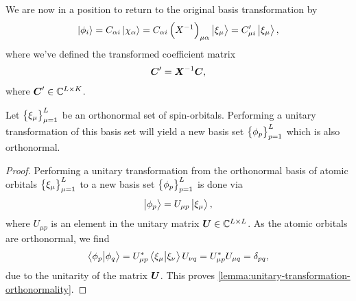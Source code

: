             We are now in a position to return to the original basis
            transformation by
            \begin{align}
                \ket{\phi_i}
                = C_{\alpha i}\ket{\chi_{\alpha}}
                = C_{\alpha i}\left( X^{-1} \right)_{\mu \alpha}
                \ket{\xi_{\mu}}
                = C_{\mu i}' \ket{\xi_{\mu}},
            \end{align}
            where we've defined the transformed coefficient matrix
            \begin{align}
                \boldsymbol{C}'
                = \boldsymbol{X}^{-1}\boldsymbol{C},
            \end{align}
            where $\boldsymbol{C}' \in \mathbb{C}^{L \times K}$.

            \begin{lemma}
                \label{lemma:unitary-transformation-orthonormality}
                Let $\left\{ \xi_{\mu} \right\}_{\mu = 1}^{L}$ be an orthonormal set of
                spin-orbitals.
                Performing a unitary transformation of this basis set will yield
                a new basis set $\left\{ \phi_{p} \right\}_{p = 1}^{L}$ which is also
                orthonormal.
            \end{lemma}
            \begin{proof}
                Performing a unitary transformation from the orthonormal basis
                of atomic orbitals $\left\{ \xi_{\mu} \right\}_{\mu = 1}^{L}$ to a new
                basis set $\left\{ \phi_p \right\}_{p = 1}^{L}$ is done via
                \begin{align}
                    \ket{\phi_p} = U_{\mu p}\ket{\xi_{\mu}},
                \end{align}
                where $U_{\mu p}$ is an element in the unitary matrix $\boldsymbol{U}
                \in \mathbb{C}^{L \times L}$.
                As the atomic orbitals are orthonormal, we find
                \begin{align}
                    \braket{\phi_{p}}{\phi_{q}}
                    =
                    U^{*}_{\mu p} \braket{\xi_{\mu}}{\xi_{\nu}}
                    U_{\nu q}
                    = U^{*}_{\mu p} U_{\mu q}
                    = \delta_{pq},
                \end{align}
                due to the unitarity of the matrix $\boldsymbol{U}$.
                This proves
                \autoref{lemma:unitary-transformation-orthonormality}.
            \end{proof}



